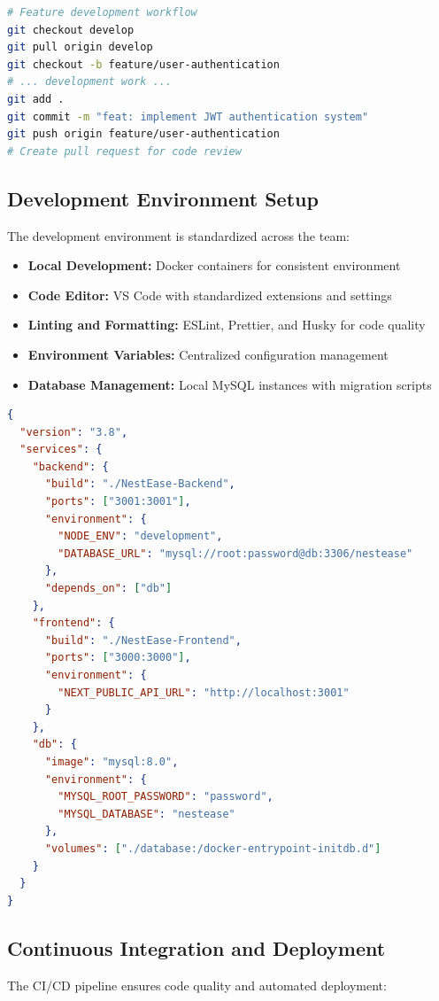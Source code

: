 \documentclass[conference]{IEEEtran}
\begin{document}
\begin{lstlisting}[language=bash, caption=Git Workflow Commands]
# Feature development workflow
git checkout develop
git pull origin develop
git checkout -b feature/user-authentication
# ... development work ...
git add .
git commit -m "feat: implement JWT authentication system"
git push origin feature/user-authentication
# Create pull request for code review
\end{lstlisting}

\subsection{Development Environment Setup}
The development environment is standardized across the team:

\begin{itemize}
    \item \textbf{Local Development:} Docker containers for consistent environment
    \item \textbf{Code Editor:} VS Code with standardized extensions and settings
    \item \textbf{Linting and Formatting:} ESLint, Prettier, and Husky for code quality
    \item \textbf{Environment Variables:} Centralized configuration management
    \item \textbf{Database Management:} Local MySQL instances with migration scripts
\end{itemize}

\begin{lstlisting}[language=json, caption=Docker Compose Configuration]
{
  "version": "3.8",
  "services": {
    "backend": {
      "build": "./NestEase-Backend",
      "ports": ["3001:3001"],
      "environment": {
        "NODE_ENV": "development",
        "DATABASE_URL": "mysql://root:password@db:3306/nestease"
      },
      "depends_on": ["db"]
    },
    "frontend": {
      "build": "./NestEase-Frontend",
      "ports": ["3000:3000"],
      "environment": {
        "NEXT_PUBLIC_API_URL": "http://localhost:3001"
      }
    },
    "db": {
      "image": "mysql:8.0",
      "environment": {
        "MYSQL_ROOT_PASSWORD": "password",
        "MYSQL_DATABASE": "nestease"
      },
      "volumes": ["./database:/docker-entrypoint-initdb.d"]
    }
  }
}
\end{lstlisting}

\subsection{Continuous Integration and Deployment}
The CI/CD pipeline ensures code quality and automated deployment:
\end{document}
